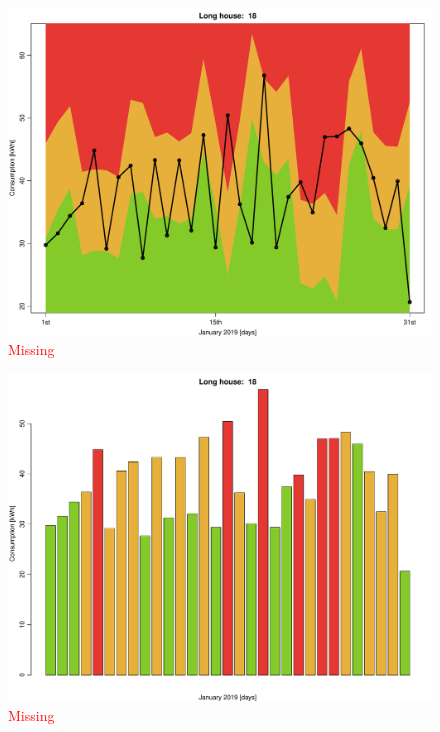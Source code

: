 \begin{figure}
    \centering
    \includegraphics[width=.8\textwidth]{../../../figures/lmpred_col_18L.pdf}
    \caption{\textcolor{red}{Missing}}
    \label{fig: lmpred_col_18L}
\end{figure}
\begin{figure}
    \centering
    \includegraphics[width=.8\textwidth]{../../../figures/lmpred_hist_18L.pdf}
    \caption{\textcolor{red}{Missing}}
    \label{fig: lmpred_hist_18L}
\end{figure}
